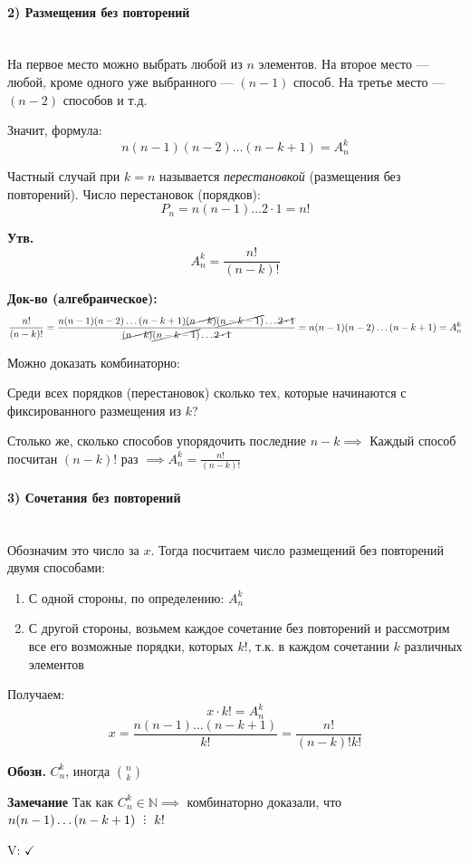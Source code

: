 \documentclass[10pt, a4paper]{article}
\def\divby{%
  \mathrel{\text{\vbox{\baselineskip.65ex\lineskiplimit0pt\hbox{.}\hbox{.}\hbox{.}}}}%
}
\begin{document}
\paragraph{2) Размещения без повторений}~\\[0.3em]
На первое место можно выбрать любой из $n$ элементов. На второе место --- любой, кроме одного уже выбранного --- $(n-1)$ способ. На третье место --- $(n-2)$ способов и т.д.

Значит, формула:
$$n(n-1)(n-2)\dots(n-k+1) = A_n^k$$

Частный случай при $k=n$ называется \textit{перестановкой} (размещения без повторений). 
Число перестановок (порядков):
$$P_n = n(n-1)\dots 2 \cdot 1 = n!$$

\textbf{Утв.} $$A_n^k = \frac{n!}{(n-k)!}$$

\textbf{Док-во (алгебраическое):}
$$\frac{n!}{(n-k)!} = \frac{n(n-1)(n-2)\dots(n-k+1)\cancel{(n-k)}\cancel{(n-k-1)}\dots \cancel{2\cdot 1}}{\cancel{(n-k)}\cancel{(n-k-1)}\dots \cancel{2\cdot 1}} = n(n-1)(n-2)\dots(n-k+1) = A_n^k$$

Можно доказать комбинаторно:

\vspace{0.2cm}
Среди всех порядков (перестановок) сколько тех, которые начинаются с фиксированного размещения из $k$?

Столько же, сколько способов упорядочить последние $n-k \implies$ Каждый способ посчитан $(n-k)!$ раз $\implies A_n^k = \frac{n!}{(n-k)!}$

\paragraph{3) Сочетания без повторений}~\\[0.3em]
Обозначим это число за $x$.
Тогда посчитаем число размещений без повторений двумя способами:
\begin{enumerate}
    \item С одной стороны, по определению: $A_n^k$
    \item С другой стороны, возьмем каждое сочетание без повторений и рассмотрим все его возможные порядки, которых $k!$, т.к. в каждом сочетании $k$ различных элементов
\end{enumerate}

Получаем: 
$$x \cdot k! = A_n^k$$
$$x = \frac{n(n-1)\dots(n-k+1)}{k!} = \frac{n!}{(n-k)!k!}$$

\textbf{Обозн.} $C_n^k$, иногда ${n \choose k}$

\textbf{Замечание} Так как $C_n^k \in \mathbb{N} \implies$ комбинаторно доказали, что $n(n-1)\dots(n-k+1) \ \divby \ k!$

{\color{gray}V: $\checkmark$}
\end{document}
